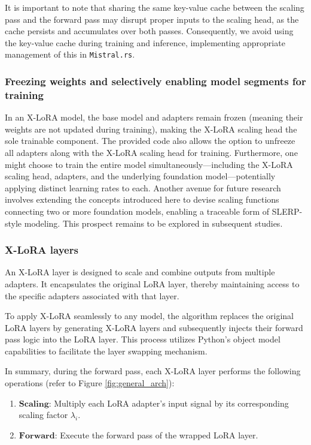 It is important to note that sharing the same key-value cache between the scaling pass and the forward pass may disrupt proper inputs to the scaling head, as the cache persists and accumulates over both passes. Consequently, we avoid using the key-value cache during training and inference, implementing appropriate management of this in \texttt{Mistral.rs}.

\subsubsection{Freezing weights and selectively enabling model segments for training} In an X-LoRA model, the base model and adapters remain frozen (meaning their weights are not updated during training), making the X-LoRA scaling head the sole trainable component. The provided code also allows the option to unfreeze all adapters along with the X-LoRA scaling head for training. Furthermore, one might choose to train the entire model simultaneously—including the X-LoRA scaling head, adapters, and the underlying foundation model—potentially applying distinct learning rates to each. Another avenue for future research involves extending the concepts introduced here to devise scaling functions connecting two or more foundation models, enabling a traceable form of SLERP-style modeling. This prospect remains to be explored in subsequent studies.

\subsubsection{X-LoRA layers} An X-LoRA layer is designed to scale and combine outputs from multiple adapters. It encapsulates the original LoRA layer, thereby maintaining access to the specific adapters associated with that layer.

To apply X-LoRA seamlessly to any model, the algorithm replaces the original LoRA layers by generating X-LoRA layers and subsequently injects their forward pass logic into the LoRA layer. This process utilizes Python’s object model capabilities to facilitate the layer swapping mechanism.

In summary, during the forward pass, each X-LoRA layer performs the following operations (refer to Figure \ref{fig:general_arch}):

\begin{enumerate}
    \item $\mathbf{Scaling}$: Multiply each LoRA adapter’s input signal by its corresponding scaling factor $\lambda_i$.
    \item $\mathbf{Forward}$: Execute the forward pass of the wrapped LoRA layer.
\end{enumerate}

